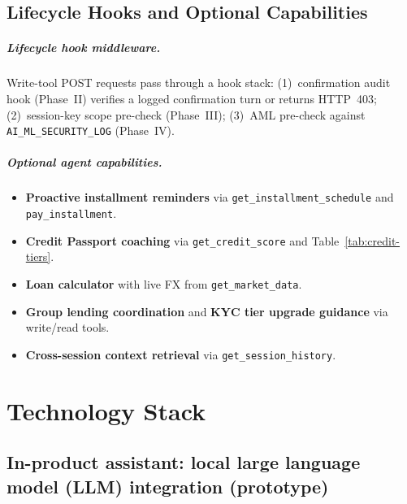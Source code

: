\documentclass[12pt,a4paper]{report}
\begin{document}
\section{Lifecycle Hooks and Optional Capabilities}

\paragraph{Lifecycle hook middleware.}
Write-tool POST requests pass through a hook stack: (1)~confirmation audit hook (Phase~II) verifies a logged confirmation turn or returns HTTP~403; (2)~session-key scope pre-check (Phase~III); (3)~AML pre-check against \texttt{AI\_ML\_SECURITY\_LOG} (Phase~IV).

\paragraph{Optional agent capabilities.}
\begin{itemize}[noitemsep]
\item \textbf{Proactive installment reminders} via \texttt{get\_installment\_schedule} and \texttt{pay\_installment}.
\item \textbf{Credit Passport coaching} via \texttt{get\_credit\_score} and Table~\ref{tab:credit-tiers}.
\item \textbf{Loan calculator} with live FX from \texttt{get\_market\_data}.
\item \textbf{Group lending coordination} and \textbf{KYC tier upgrade guidance} via write/read tools.
\item \textbf{Cross-session context retrieval} via \texttt{get\_session\_history}.
\end{itemize}

\chapter{Technology Stack}

\section{In-product assistant: local large language model (LLM) integration (prototype)}
\end{document}
